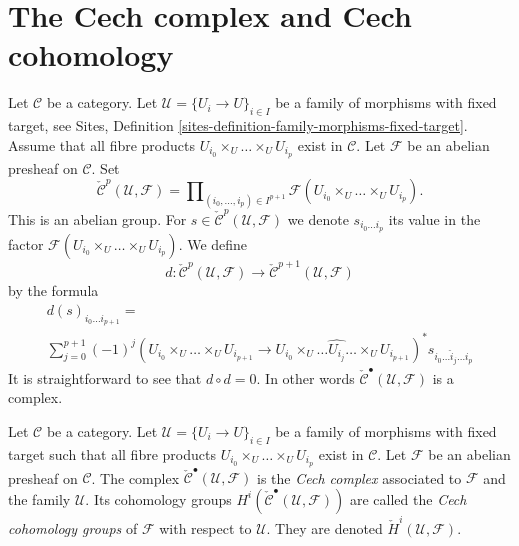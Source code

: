 \section{The Cech complex and Cech cohomology}
\label{section-cech}

\noindent
Let $\mathcal{C}$ be a category. Let $\mathcal{U} = \{U_i \to U\}_{i \in I}$
be a family of morphisms with fixed target, see
Sites, Definition \ref{sites-definition-family-morphisms-fixed-target}.
Assume that all fibre products $U_{i_0} \times_U \ldots \times_U U_{i_p}$
exist in $\mathcal{C}$. Let $\mathcal{F}$ be an abelian presheaf on
$\mathcal{C}$. Set
$$
\check{\mathcal{C}}^p(\mathcal{U}, \mathcal{F})
=
\prod\nolimits_{(i_0, \ldots, i_p) \in I^{p + 1}}
\mathcal{F}(U_{i_0} \times_U \ldots \times_U U_{i_p}).
$$
This is an abelian group. For
$s \in \check{\mathcal{C}}^p(\mathcal{U}, \mathcal{F})$ we denote
$s_{i_0\ldots i_p}$ its value in the factor
$\mathcal{F}(U_{i_0} \times_U \ldots \times_U U_{i_p})$.
We define
$$
d : \check{\mathcal{C}}^p(\mathcal{U}, \mathcal{F})
\longrightarrow
\check{\mathcal{C}}^{p + 1}(\mathcal{U}, \mathcal{F})
$$
by the formula
\begin{align}
\label{equation-d-cech}
d(s)_{i_0\ldots i_{p + 1}}
= \quad\quad\quad\quad\quad\quad\quad\quad\quad\quad\quad\quad\quad\quad\quad
\\
\sum\nolimits_{j = 0}^{p + 1}
(-1)^j
(U_{i_0} \times_U \ldots \times_U U_{i_{p + 1}}
\longrightarrow
U_{i_0} \times_U \ldots \widehat{U_{i_j}} \ldots \times_U U_{i_{p + 1}})^*
s_{i_0\ldots \hat i_j \ldots i_p} \nonumber
\end{align}
It is straightforward to see that $d \circ d = 0$. In other words
$\check{\mathcal{C}}^\bullet(\mathcal{U}, \mathcal{F})$ is a complex.

\begin{definition}
\label{definition-cech-complex}
Let $\mathcal{C}$ be a category. Let $\mathcal{U} = \{U_i \to U\}_{i \in I}$
be a family of morphisms with fixed target such that all fibre products
$U_{i_0} \times_U \ldots \times_U U_{i_p}$ exist in $\mathcal{C}$.
Let $\mathcal{F}$ be an abelian presheaf on $\mathcal{C}$.
The complex $\check{\mathcal{C}}^\bullet(\mathcal{U}, \mathcal{F})$
is the {\it Cech complex} associated to $\mathcal{F}$ and the
family $\mathcal{U}$. Its cohomology groups
$H^i(\check{\mathcal{C}}^\bullet(\mathcal{U}, \mathcal{F}))$ are
called the {\it Cech cohomology groups} of $\mathcal{F}$ with respect
to $\mathcal{U}$. They are denoted $\check H^i(\mathcal{U}, \mathcal{F})$.
\end{definition}

